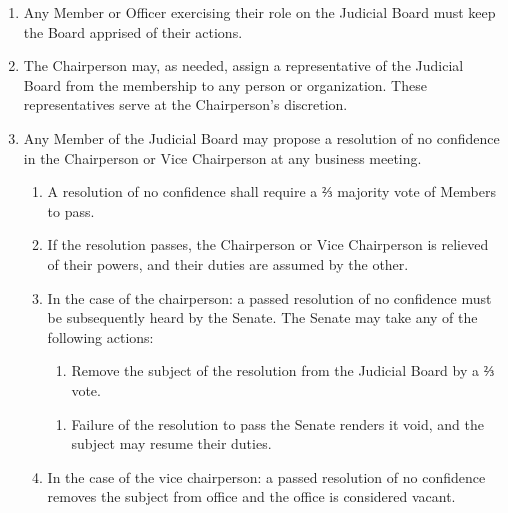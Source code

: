 \begin{enumerate}
\begin{enumerate}
    \item Any Member of the Judicial Board may call for the demotion of an officer at any business meeting. Upon confirmation by a ⅔ majority of Members, the officer is demoted, and the Chairperson may not reappoint the same Member to the same role.
\end{enumerate}
\item Any Member or Officer exercising their role on the Judicial Board must keep the Board apprised of their actions. 
\item The Chairperson may, as needed, assign a representative of the Judicial Board from the membership to any person or organization. These representatives serve at the Chairperson's discretion. 
\item Any Member of the Judicial Board may propose a resolution of no confidence in the Chairperson or Vice Chairperson at any business meeting.
        \begin{enumerate}
            \item A resolution of no confidence shall require a ⅔ majority vote of Members to pass.
                \item If the resolution passes, the Chairperson or Vice Chairperson is relieved of their powers, and their duties are assumed by the other.
                \item In the case of the chairperson: a passed resolution of no confidence must be subsequently heard by the Senate. The Senate may take any of the following actions: 
            \begin{enumerate}
                \item Remove the subject of the resolution from the Judicial Board by a ⅔ vote.
            \end{enumerate}
            \begin{enumerate}
                \item Failure of the resolution to pass the Senate renders it void, and the subject may resume their duties.
            \end{enumerate}
        \item In the case of the vice chairperson: a passed resolution of no confidence removes the subject from office and the office is considered vacant.
    \end{enumerate}




\end{enumerate}



